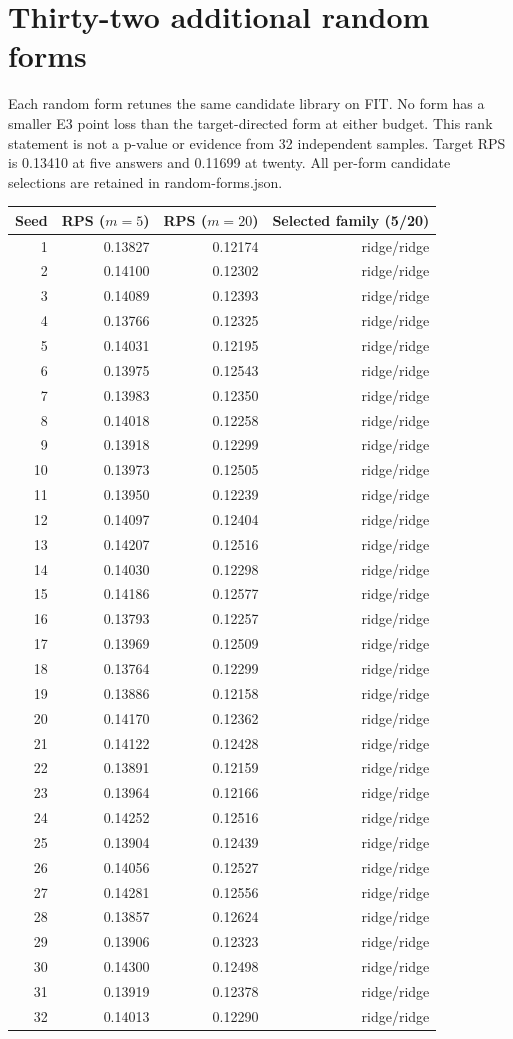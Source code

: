 \documentclass[10pt]{article}
\begin{document}
\section{Thirty-two additional random forms}
Each random form retunes the same candidate library on FIT. No form has a smaller
E3 point loss than the target-directed form at either budget. This rank statement
is not a p-value or evidence from 32 independent samples. Target RPS is
0.13410 at five answers and 0.11699 at twenty.
All per-form candidate selections are retained in random-forms.json.
\begin{longtable}{rrrr}\toprule Seed & RPS ($m=5$) & RPS ($m=20$) & Selected family (5/20)\\\midrule\endhead
1 & 0.13827 & 0.12174 & ridge/ridge\\
2 & 0.14100 & 0.12302 & ridge/ridge\\
3 & 0.14089 & 0.12393 & ridge/ridge\\
4 & 0.13766 & 0.12325 & ridge/ridge\\
5 & 0.14031 & 0.12195 & ridge/ridge\\
6 & 0.13975 & 0.12543 & ridge/ridge\\
7 & 0.13983 & 0.12350 & ridge/ridge\\
8 & 0.14018 & 0.12258 & ridge/ridge\\
9 & 0.13918 & 0.12299 & ridge/ridge\\
10 & 0.13973 & 0.12505 & ridge/ridge\\
11 & 0.13950 & 0.12239 & ridge/ridge\\
12 & 0.14097 & 0.12404 & ridge/ridge\\
13 & 0.14207 & 0.12516 & ridge/ridge\\
14 & 0.14030 & 0.12298 & ridge/ridge\\
15 & 0.14186 & 0.12577 & ridge/ridge\\
16 & 0.13793 & 0.12257 & ridge/ridge\\
17 & 0.13969 & 0.12509 & ridge/ridge\\
18 & 0.13764 & 0.12299 & ridge/ridge\\
19 & 0.13886 & 0.12158 & ridge/ridge\\
20 & 0.14170 & 0.12362 & ridge/ridge\\
21 & 0.14122 & 0.12428 & ridge/ridge\\
22 & 0.13891 & 0.12159 & ridge/ridge\\
23 & 0.13964 & 0.12166 & ridge/ridge\\
24 & 0.14252 & 0.12516 & ridge/ridge\\
25 & 0.13904 & 0.12439 & ridge/ridge\\
26 & 0.14056 & 0.12527 & ridge/ridge\\
27 & 0.14281 & 0.12556 & ridge/ridge\\
28 & 0.13857 & 0.12624 & ridge/ridge\\
29 & 0.13906 & 0.12323 & ridge/ridge\\
30 & 0.14300 & 0.12498 & ridge/ridge\\
31 & 0.13919 & 0.12378 & ridge/ridge\\
32 & 0.14013 & 0.12290 & ridge/ridge\\
\bottomrule\end{longtable}
\end{document}
